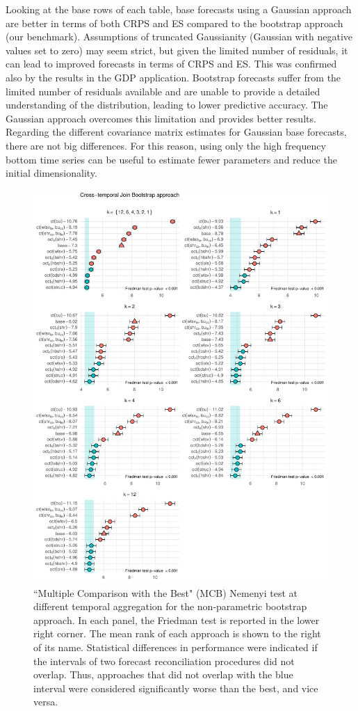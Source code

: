 \documentclass[a4paper,11pt]{article}
\theoremstyle{definition}
\begin{document}
Looking at the base rows of each table, base forecasts using a Gaussian approach are better in terms of both CRPS and ES compared to the bootstrap approach (our benchmark). Assumptions of truncated Gaussianity (Gaussian with negative values set to zero) may seem strict, but given the limited number of residuals, it can lead to improved forecasts in terms of CRPS and ES. This was confirmed also by the results in the GDP application. Bootstrap forecasts suffer from the limited number of residuals available and are unable to provide a detailed understanding of the distribution, leading to lower predictive accuracy. The Gaussian approach overcomes this limitation and provides better results. Regarding the different covariance matrix estimates for Gaussian base forecasts, there are not big differences. For this reason, using only the high frequency bottom time series can be useful to estimate fewer parameters and reduce the initial dimensionality.

\begin{figure}[p]
	\centering
	\includegraphics[width = 0.95\linewidth]{fig/VN525/ctjb_more.pdf}
	\caption{“Multiple Comparison with the Best" (MCB) Nemenyi test at different temporal aggregation for the non-parametric bootstrap approach. In each panel, the Friedman test is reported in the lower right corner. The mean rank of each approach is shown to the right of its name. Statistical differences in performance were indicated if the intervals of two forecast reconciliation procedures did not overlap. Thus, approaches that did not overlap with the blue interval were considered significantly worse than the best, and vice versa.}
	\label{fig:vnmcb_ctjb}
\end{figure}
\end{document}
